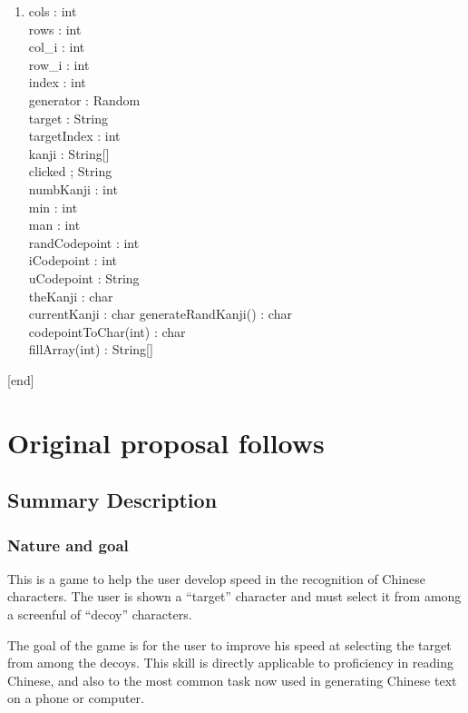 \documentclass[11pt,asymmetric]{article}
\begin{document}
\begin{enumerate}
\item {}
 {cols : int\\
  rows : int\\
  col\_i : int\\
  row\_i : int\\
  index : int\\
  generator : Random\\
  target : String\\
  targetIndex : int\\
  kanji : String[]\\
  clicked ; String\\
  numbKanji : int\\
  min : int\\
  man : int\\
  randCodepoint : int\\
  iCodepoint : int\\
  uCodepoint : String\\
  theKanji : char\\
  currentKanji : char
 }
 {generateRandKanji() : char\\
 codepointToChar(int) : char\\
 fillArray(int) : String[]}

\end{enumerate}

[end]


\clearpage
\section{Original proposal follows}

\subsection{Summary Description}
\subsubsection{Nature and goal}
This is a game to help the user develop speed in the recognition of Chinese characters. The user is shown a ``target'' character and must select it from among a screenful of ``decoy'' characters.

The goal of the game is for the user to improve his speed at selecting the target from among the decoys. This skill is directly applicable to proficiency in reading Chinese, and also to the most common task now used in generating Chinese text on a phone or computer.
\end{document}
